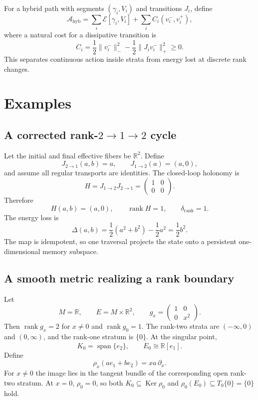 \documentclass[11pt]{article}
\newcommand{\R}{\mathbb{R}}
\newcommand{\Ker}{\operatorname{Ker}}
\newcommand{\rank}{\operatorname{rank}}
\newcommand{\Span}{\operatorname{span}}
\begin{document}
For a hybrid path with segments $(\gamma_i,V_i)$ and transitions $J_i$, define
\[
\mathcal A_{\mathrm{hyb}}
=\sum_i\mathcal E[\gamma_i,V_i]
+\sum_i C_i(v_i^-,v_i^+),
\]
where a natural cost for a dissipative transition is
\[
C_i
=\frac12\|v_i^-\|_-^2-
\frac12\|J_iv_i^-\|_+^2\ge0.
\]
This separates continuous action inside strata from energy lost at discrete
rank changes.

\section{Examples}
\label{sec:examples}

\subsection{A corrected rank-$2\to1\to2$ cycle}

Let the initial and final effective fibers be $\R^2$. Define
\[
J_{2\to1}(a,b)=a,
\qquad
J_{1\to2}(a)=(a,0),
\]
and assume all regular transports are identities. The closed-loop holonomy is
\[
H=J_{1\to2}J_{2\to1}
=\begin{pmatrix}1&0\\0&0\end{pmatrix}.
\]
Therefore
\[
H(a,b)=(a,0),
\qquad
\rank H=1,
\qquad
\delta_{\mathrm{rank}}=1.
\]
The energy loss is
\[
\Delta(a,b)=\frac12(a^2+b^2)-\frac12a^2=\frac12b^2.
\]
The map is idempotent, so one traversal projects the state onto a persistent
one-dimensional memory subspace.

\subsection{A smooth metric realizing a rank boundary}

Let
\[
M=\R,
\qquad
E=M\times\R^2,
\qquad
g_x=\begin{pmatrix}1&0\\0&x^2\end{pmatrix}.
\]
Then $\rank g_x=2$ for $x\ne0$ and $\rank g_0=1$. The rank-two strata are
$(-\infty,0)$ and $(0,\infty)$, and the rank-one stratum is $\{0\}$. At the
singular point,
\[
K_0=\Span\{e_2\},
\qquad
\overline E_0\cong\R[e_1].
\]
Define
\[
\rho_x(ae_1+be_2)=xa\,\partial_x.
\]
For $x\ne0$ the image lies in the tangent bundle of the corresponding open
rank-two stratum. At $x=0$, $\rho_0=0$, so both
$K_0\subseteq\Ker\rho_0$ and
$\rho_0(E_0)\subseteq T_0\{0\}=\{0\}$ hold.
\end{document}
